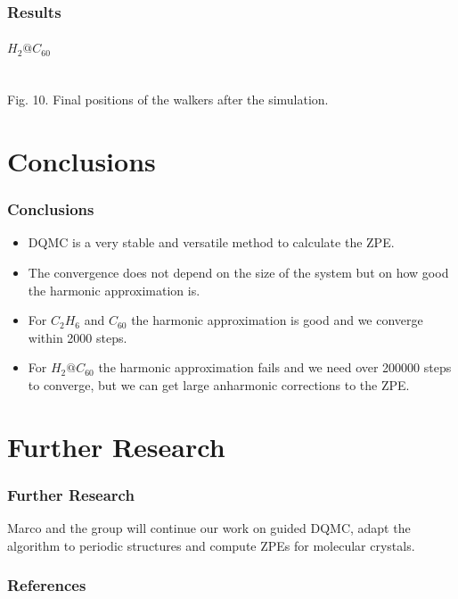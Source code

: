 \documentclass[16pt]{beamer}
\begin{document}
\begin{frame}
\frametitle{Results}
\framesubtitle{$H_2@C_{60}$}
\begin{center}
\\
Fig. 10. Final positions of the walkers after the simulation.
\end{center}
\end{frame}

\section{Conclusions}
\begin{frame}
\frametitle{Conclusions}
\begin{itemize}
\item DQMC is a very stable and versatile method to calculate the ZPE.
\item The convergence does not depend on the size of the system but on how good the harmonic approximation is. 
\item For $C_2H_6$ and $C_{60}$ the harmonic approximation is good and we converge within 2000 steps.
\item For $H_2@C_{60}$ the harmonic approximation fails and we need over 200000 steps to converge, but we can get large anharmonic corrections to the ZPE.
\end{itemize}
\end{frame}

\section{Further Research}
\begin{frame}
\frametitle{Further Research}
Marco and the group will continue our work on guided DQMC, adapt the algorithm to periodic structures and compute ZPEs for molecular crystals.
\end{frame}


\begin{frame}
\frametitle{References}

\begin{scriptsize}

\end{scriptsize}
\end{frame}
\end{document}
